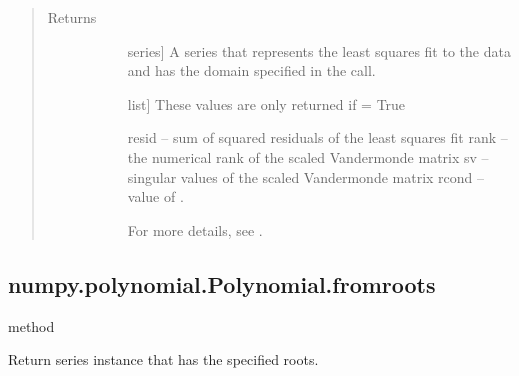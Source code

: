 \documentclass[letterpaper,10pt,english]{sphinxmanual}
\begin{document}
\begin{fulllineitems}
\begin{fulllineitems}
\begin{quote}
\begin{description}
\begin{description}

\end{description}

\item[{Returns}] \leavevmode\begin{description}
\item[{}] \leavevmode{[}series{]}
A series that represents the least squares fit to the data and
has the domain specified in the call.

\item[{}] \leavevmode{[}list{]}
These values are only returned if  = True

resid – sum of squared residuals of the least squares fit
rank – the numerical rank of the scaled Vandermonde matrix
sv – singular values of the scaled Vandermonde matrix
rcond – value of .

For more details, see .

\end{description}

\end{description}\end{quote}

\end{fulllineitems}



\subsection{numpy.polynomial.Polynomial.fromroots}
\label{\detokenize{generated/generated/numpy.polynomial.Polynomial.fromroots:numpy-polynomial-polynomial-fromroots}}\label{\detokenize{generated/generated/numpy.polynomial.Polynomial.fromroots::doc}}
method

\begin{fulllineitems}
\label{\detokenize{generated/generated/numpy.polynomial.Polynomial.fromroots:numpy.polynomial.Polynomial.fromroots}}
Return series instance that has the specified roots.


\end{fulllineitems}
\end{fulllineitems}
\end{document}
